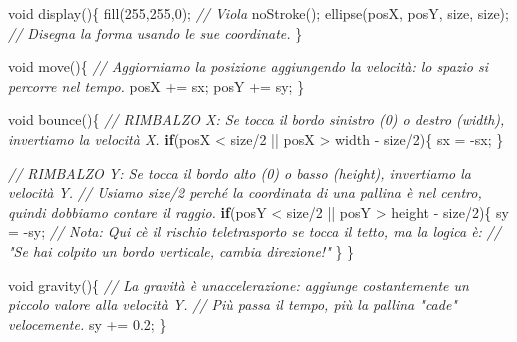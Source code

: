 \documentclass[
]{article}
\newenvironment{Shaded}{}{}
\newcommand{\CommentTok}[1]{\textcolor[rgb]{0.38,0.63,0.69}{\textit{#1}}}
\newcommand{\ControlFlowTok}[1]{\textcolor[rgb]{0.00,0.44,0.13}{\textbf{#1}}}
\newcommand{\DataTypeTok}[1]{\textcolor[rgb]{0.56,0.13,0.00}{#1}}
\newcommand{\DecValTok}[1]{\textcolor[rgb]{0.25,0.63,0.44}{#1}}
\newcommand{\FloatTok}[1]{\textcolor[rgb]{0.25,0.63,0.44}{#1}}
\newcommand{\FunctionTok}[1]{\textcolor[rgb]{0.02,0.16,0.49}{#1}}
\newcommand{\NormalTok}[1]{#1}
\newcommand{\OperatorTok}[1]{\textcolor[rgb]{0.40,0.40,0.40}{#1}}
\begin{document}
\begin{Shaded}
\begin{Highlighting}[]
  \DataTypeTok{void} \FunctionTok{display}\OperatorTok{()\{} 
    \FunctionTok{fill}\OperatorTok{(}\DecValTok{255}\OperatorTok{,}\DecValTok{255}\OperatorTok{,}\DecValTok{0}\OperatorTok{);} \CommentTok{// Viola}
    \FunctionTok{noStroke}\OperatorTok{();} 
    \FunctionTok{ellipse}\OperatorTok{(}\NormalTok{posX}\OperatorTok{,}\NormalTok{ posY}\OperatorTok{,}\NormalTok{ size}\OperatorTok{,}\NormalTok{ size}\OperatorTok{);} \CommentTok{// Disegna la forma usando le sue coordinate.}
  \OperatorTok{\}}
  
  \DataTypeTok{void} \FunctionTok{move}\OperatorTok{()\{} 
    \CommentTok{// Aggiorniamo la posizione aggiungendo la velocità: lo spazio si percorre nel tempo.}
\NormalTok{    posX }\OperatorTok{+=}\NormalTok{ sx}\OperatorTok{;}
\NormalTok{    posY }\OperatorTok{+=}\NormalTok{ sy}\OperatorTok{;}
  \OperatorTok{\}}
  
  \DataTypeTok{void} \FunctionTok{bounce}\OperatorTok{()\{} 
    \CommentTok{// RIMBALZO X: Se tocca il bordo sinistro (0) o destro (width), invertiamo la velocità X.}
    \ControlFlowTok{if}\OperatorTok{(}\NormalTok{posX }\OperatorTok{\textless{}}\NormalTok{ size}\OperatorTok{/}\DecValTok{2} \OperatorTok{||}\NormalTok{ posX }\OperatorTok{\textgreater{}}\NormalTok{ width }\OperatorTok{{-}}\NormalTok{ size}\OperatorTok{/}\DecValTok{2}\OperatorTok{)\{} 
\NormalTok{      sx }\OperatorTok{=} \OperatorTok{{-}}\NormalTok{sx}\OperatorTok{;} 
    \OperatorTok{\}}
    
    \CommentTok{// RIMBALZO Y: Se tocca il bordo alto (0) o basso (height), invertiamo la velocità Y.}
    \CommentTok{// Usiamo size/2 perché la coordinata di una pallina è nel centro, quindi dobbiamo contare il raggio.}
    \ControlFlowTok{if}\OperatorTok{(}\NormalTok{posY }\OperatorTok{\textless{}}\NormalTok{ size}\OperatorTok{/}\DecValTok{2} \OperatorTok{||}\NormalTok{ posY }\OperatorTok{\textgreater{}}\NormalTok{ height }\OperatorTok{{-}}\NormalTok{ size}\OperatorTok{/}\DecValTok{2}\OperatorTok{)\{} 
\NormalTok{      sy }\OperatorTok{=} \OperatorTok{{-}}\NormalTok{sy}\OperatorTok{;} 
      \CommentTok{// Nota: Qui c\textquotesingle{}è il rischio teletrasporto se tocca il tetto, ma la logica è:}
      \CommentTok{// "Se hai colpito un bordo verticale, cambia direzione!"}
    \OperatorTok{\}}
  \OperatorTok{\}}
  
  \DataTypeTok{void} \FunctionTok{gravity}\OperatorTok{()\{}
    \CommentTok{// La gravità è un\textquotesingle{}accelerazione: aggiunge costantemente un piccolo valore alla velocità Y.}
    \CommentTok{// Più passa il tempo, più la pallina "cade" velocemente.}
\NormalTok{    sy }\OperatorTok{+=} \FloatTok{0.2}\OperatorTok{;} 
  \OperatorTok{\}}
  

\end{Highlighting}
\end{Shaded}
\end{document}
